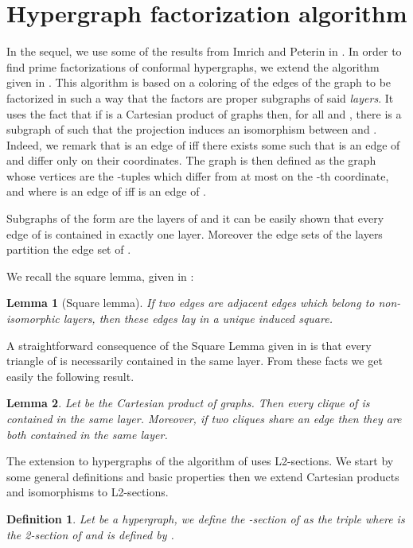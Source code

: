 \documentclass[copyright]{eptcs}
\newtheorem{Def}{Definition}
\newtheorem{Lem}{Lemma}
\newcommand{\chg}[1]{{#1}}
\begin{document}
\section{Hypergraph factorization algorithm}
In the sequel, we use some of the results from Imrich and Peterin in \cite{ImPe}. In order to find prime factorizations of conformal hypergraphs, we extend the algorithm given in \cite{ImPe}. This algorithm is based on a coloring of the edges of the graph  to be factorized in such a way that the factors are proper subgraphs of  said \emph{layers}. It uses the fact that if  is a Cartesian product of graphs then, for all  and , there is a subgraph  of  such that the  projection  induces an isomorphism between  and . Indeed, we remark that  is an edge of  iff there exists some  such that  is an edge of  and  differ only on their  coordinates. The graph  is then defined as the graph whose vertices are the -tuples which differ from  at most on the -th coordinate, and where  is an edge of  iff  is an edge of .

Subgraphs of the form  are the layers of  and it can be easily shown that every edge of  is contained in exactly one layer. Moreover the edge sets of the layers partition the edge set of .

\chg{We recall the square lemma, given in \cite{ImPe}:}

\begin{Lem}[Square lemma]\label{LmSq}
 \chg{If two edges are adjacent edges which belong to non-isomorphic layers, then these edges lay in a unique induced square.}
\end{Lem}

 A \chg{straightforward} consequence of the Square Lemma given in \cite{ImPe} is that every triangle of  is necessarily contained in the same layer. From these facts we get easily the following result.

\begin{Lem}\label{LmCliqueInLayer} Let  be the Cartesian product of graphs. Then every clique of  is contained in the same layer. Moreover, if two cliques share an edge then they are both contained in the same layer.
\end{Lem}

The extension to hypergraphs of the algorithm of \cite{ImPe} uses L2-sections. We start by some general definitions and basic properties then we extend Cartesian products and isomorphisms to L2-sections.


\begin{Def}\label{DfL2Section} Let  be a hypergraph, we define the -section  of  as the triple  where   is the 2-section of  and  is defined by .\\
\end{Def}
\end{document}
